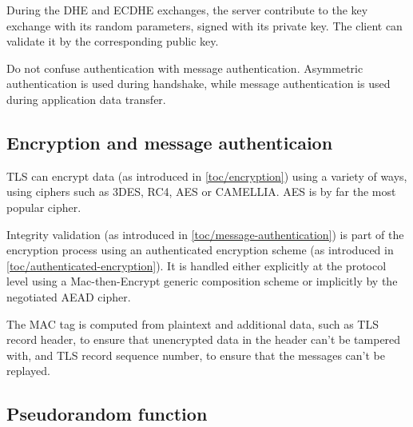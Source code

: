 During the DHE and ECDHE exchanges, the server contribute to the key exchange with its random parameters, signed with its private key. The client can validate it by the corresponding public key.

Do not confuse authentication with message authentication. Asymmetric authentication is used during handshake, while message authentication is used during application data transfer.

\subsection{Encryption and message authenticaion}

TLS can encrypt data (as introduced in \autoref{toc/encryption}) using a variety of ways, using ciphers such as 3DES, RC4, AES or CAMELLIA. AES is by far the most popular cipher.

Integrity validation (as introduced in \autoref{toc/message-authentication}) is part of the encryption process using an authenticated encryption scheme (as introduced in \autoref{toc/authenticated-encryption}). It is handled either explicitly at the protocol level using a Mac-then-Encrypt generic composition scheme or implicitly by the negotiated AEAD cipher.

The MAC tag is computed from plaintext and additional data, such as TLS record header, to ensure that unencrypted data in the header can't be tampered with, and TLS record sequence number, to ensure that the messages can't be replayed.

\subsection{Pseudorandom function}
